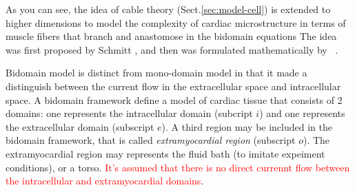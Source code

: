 

As you can see, the idea of cable theory (Sect.\ref{sec:model-cell})
is extended to higher dimensions to model the complexity of cardiac
microstructure in terms of muscle fibers that branch and anastomose in the
bidomain equations The idea was first proposed by Schmitt \citep{schmitt1969},
and then was formulated mathematically by ~\citep{tung1978}.

Bidomain model is distinct from mono-domain model in that it
made a distinguish between the current flow in the extracellular space
and intracellular space. A bidomain framework define a model of cardiac tissue
that consists of 2 domains: one represents the intracellular domain (subcript
$i$) and one represents the extracellular domain (subscript $e$). A third region
may be included in the bidomain framework, that is called {\it extramyocardial
region} (subscript $o$). The extramyocardial region may represents the fluid
bath (to imitate expeiment conditions), or a torso. \textcolor{red}{It's
assumed that there is no direct currennt flow between the intracellular and
extramyocardial domains}. 


